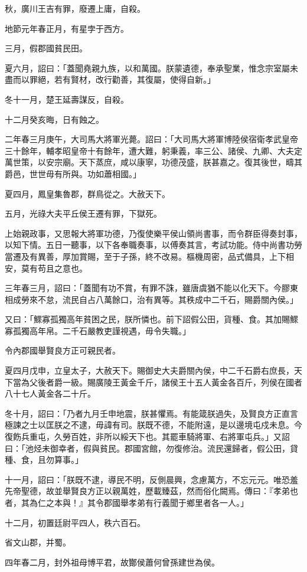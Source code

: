 \begin{pinyinscope}
秋，廣川王吉有罪，廢遷上庸，自殺。

地節元年春正月，有星孛于西方。

三月，假郡國貧民田。

夏六月，詔曰：「蓋聞堯親九族，以和萬國。朕蒙遺德，奉承聖業，惟念宗室屬未盡而以罪絕，若有賢材，改行勸善，其復屬，使得自新。」

冬十一月，楚王延壽謀反，自殺。

十二月癸亥晦，日有蝕之。

二年春三月庚午，大司馬大將軍光薨。詔曰：「大司馬大將軍博陸侯宿衛孝武皇帝三十餘年，輔孝昭皇帝十有餘年，遭大難，躬秉義，率三公、諸侯、九卿、大夫定萬世策，以安宗廟。天下蒸庶，咸以康寧，功德茂盛，朕甚嘉之。復其後世，疇其爵邑，世世毋有所與。功如蕭相國。」

夏四月，鳳皇集魯郡，群鳥從之。大赦天下。

五月，光祿大夫平丘侯王遷有罪，下獄死。

上始親政事，又思報大將軍功德，乃復使樂平侯山領尚書事，而令群臣得奏封事，以知下情。五日一聽事，以下各奉職奏事，以傅奏其言，考試功能。侍中尚書功勞當遷及有異善，厚加賞賜，至于子孫，終不改易。樞機周密，品式備具，上下相安，莫有苟且之意也。

三年春三月，詔曰：「蓋聞有功不賞，有罪不誅，雖唐虞猶不能以化天下。今膠東相成勞來不怠，流民自占八萬餘口，治有異等。其秩成中二千石，賜爵關內侯。」

又曰：「鰥寡孤獨高年貧困之民，朕所憐也。前下詔假公田，貨種、食。其加賜鰥寡孤獨高年帛。二千石嚴教吏謹視遇，毋令失職。」

令內郡國舉賢良方正可親民者。

夏四月戊申，立皇太子，大赦天下。賜御史大夫爵關內侯，中二千石爵右庶長，天下當為父後者爵一級。賜廣陵王黃金千斤，諸侯王十五人黃金各百斤，列侯在國者八十七人黃金各二十斤。

冬十月，詔曰：「乃者九月壬申地震，朕甚懼焉。有能箴朕過失，及賢良方正直言極諫之士以匡朕之不逮，毋諱有司。朕既不德，不能附遠，是以邊境屯戍未息。今復飭兵重屯，久勞百姓，非所以綏天下也。其罷車騎將軍、右將軍屯兵。」又詔曰：「池烃未御幸者，假與貧民。郡國宮館，勿復修治。流民還歸者，假公田，貸種、食，且勿算事。」

十一月，詔曰：「朕既不逮，導民不明，反側晨興，念慮萬方，不忘元元。唯恐羞先帝聖德，故並舉賢良方正以親萬姓，歷載臻茲，然而俗化闕焉。傳曰：『孝弟也者，其為仁之本與！』其令郡國舉孝弟有行義聞于鄉里者各一人。」

十二月，初置廷尉平四人，秩六百石。

省文山郡，并蜀。

四年春二月，封外祖母博平君，故酇侯蕭何曾孫建世為侯。


\end{pinyinscope}
